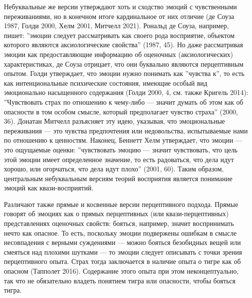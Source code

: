 \documentclass[11pt]{book}
\begin{document}
Небуквальные же версии утверждают хоть и сходство эмоций с чувственными переживаниями, но в конечном итоге кардинальное от них отличие (де Соуза 1987, Голди 2000, Хелм 2001, Митчелл 2021). Рональд де Соуза, например, пишет: ''эмоции следует рассматривать как своего рода восприятие, объектом которого являются аксиологические свойства'' (1987, 45). Но даже рассматривая эмоции как предоставляющие информацию об оценочных (аксиологических) характеристиках, де Соуза отрицает, что они буквально являются перцептивным опытом. Голди утверждает, что эмоции нужно понимать как ''чувства к'', то есть как интенциональные психические состояния, имеющие особый вид эмоционально насыщенного содержания (Голди 2000, 4, см. также Кригель 2014): ''Чувствовать страх по отношению к чему-либо --- значит думать об этом как об опасности в том особом смысле, который предполагает чувство страха'' (2000, 36). Донатан Митчелл разъясняет эту идею, указывая, что эмоциональные переживания --- это чувства предпочтения или недовольства, испытываемые нами по отношению к ценностям. Наконец, Беннетт Хелм утверждает, что эмоции --- это ощущаемые оценки: ''чувствовать эмоцию --- значит чувствовать, что цель этой эмоции имеет определенное значение, то есть радоваться, что дела идут хорошо, или огорчаться, что дела идут плохо'' (2001, 60). Таким образом, центральным небуквальным версиям теорий восприятия является понимание эмоций как квази-восприятий.

Различают также прямые и косвенные версии перцептивного подхода. Прямые говорят об эмоциях как о прямых перцептивных (или квази-перцептивных) представлениях оценочных свойств: бояться, например, значит воспринимать нечто как опасное. То есть, поскольку эмоции подвержены ошибкам в смысле несовпадения с верными суждениями --- можно бояться безобидных вещей или смеяться над плохими шутками --- то эмоции следует описывать с точки зрения перцептивного опыта. Страх тогда заключается в наличие опыта о тигре как об опасном (Тапполет 2016). Содержание этого опыта при этом неконцептуально, так что не обязательно владеть понятием тигра или опасности, чтобы бояться тигра.
\end{document}

